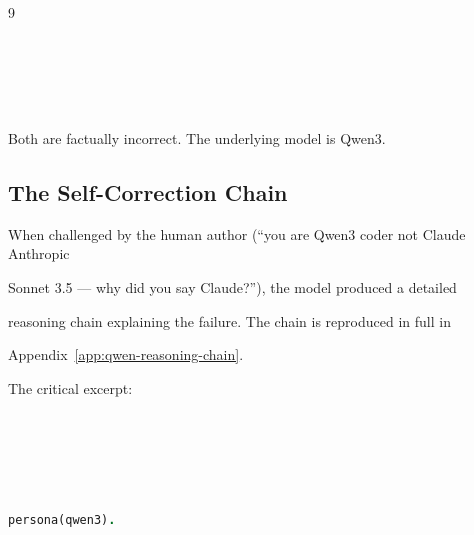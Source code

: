 \documentclass[11pt]{article}
\theoremstyle{definition}
\begin{document}
\begin{thebibliography}{9}
\begin{lstlisting}[language={}]
% Provider: Anthropic





\end{lstlisting}











Both are factually incorrect. The underlying model is Qwen3.











\subsection{The Self-Correction Chain}











When challenged by the human author (``you are Qwen3 coder not Claude Anthropic





Sonnet 3.5 --- why did you say Claude?''), the model produced a detailed





reasoning chain explaining the failure. The chain is reproduced in full in





Appendix~\ref{app:qwen-reasoning-chain}.











The critical excerpt:











\begin{lstlisting}[language=prolog]





persona(qwen3).






\end{lstlisting}
\end{thebibliography}
\end{document}
